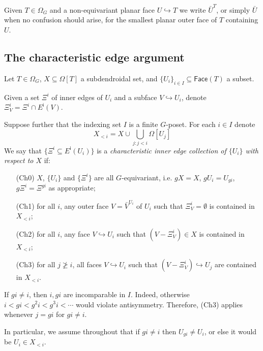 \documentclass[a4paper,10pt,draft]{article}%
\begin{document}
\begin{notation}
	Given $T\in \Omega_G$ and a non-equivariant planar face
	$U \hookrightarrow T$ we write $\bar{U}^T$, 
	or simply $\bar{U}$ when no confusion should arise, 
	for the smallest planar outer face of $T$ containing $U$.
\end{notation}




\subsection{The characteristic edge argument}

\begin{definition}\label{CHAREDGE DEF}
Let $T \in \Omega_G$, $X \subseteq \Omega[T]$ a subdendroidal set, and $\{U_i\}_{i \in I} \subseteq \mathsf{Face}(T)$ a subset.

Given a set $\Xi^i$ of inner edges of $U_i$ and a subface $V \hookrightarrow U_i$, denote $\Xi_V^i = \Xi^i \cap E^{\mathsf{i}}(V)$.

Suppose further that the indexing set $I$ is a 
finite $G$-poset. For each $i \in I$ denote
\[
X_{<i} = X \cup \bigcup_{j \colon j<i} \Omega[U_j]
\]
We say that $\{\Xi^i \subseteq E^{\mathsf{i}}(U_i)\}$ 
is a \textit{characteristic inner edge collection of $\{U_i\}$ with respect to $X$} if:
\begin{itemize}
	\item[(Ch0)] $X$, $\{U_i\}$ and $\{\Xi^i\}$ are all $G$-equivariant, i.e. $g X = X$, $g U_i = U_{gi}$, $g \Xi^i = \Xi^{gi}$ as appropriate; 
	\item[(Ch1)] for all $i$, any outer face $V = \bar{V}^{U_i}$
		of $U_i$ such that $\Xi_{V}^i = \emptyset$
		is contained in $X_{<i}$;
	\item[(Ch2)] for all $i$, any face
		$V \hookrightarrow U_i$ such that $(V-\Xi_V^i) \in X$
		is contained in $X_{<i}$;
	\item[(Ch3)] for all $j \not \geq i$, 
		all faces $V \hookrightarrow U_i$ such that 
		$(V-\Xi^i_V) \hookrightarrow U_j$
		are contained in $X_{<i}$.
\end{itemize}
\end{definition}


\begin{remark}\label{XIIII REM}
If $g i \neq i$, then $i,g i$ are incomparable in $I$. Indeed, otherwise $i<gi<g^2i<g^3i<\cdots$ would violate antisymmetry.
Therefore, (Ch3) applies whenever $j=gi$ for $gi\neq i$.

In particular, we assume throughout that if
$gi \neq i$ then $U_{gi} \neq U_i$,
or else it would be $U_i \in X_{<i}$.
\end{remark}
\end{document}
